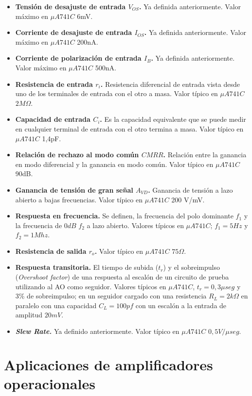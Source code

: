 \begin{itemize}
	\item \textbf{Tensión de desajuste de entrada $V_{OS}$.} Ya
	definida anteriormente. Valor máximo en $\mu A 741C$ 6mV.
	\item \textbf{Corriente de desajuste de entrada $I_{OS}$.} Ya
	definida anteriormente. Valor máximo en $\mu A 741C$ 200nA.
	\item  \textbf{Corriente de polarización de entrada $I_B$.} Ya
	definida anteriormente. Valor máximo en $\mu A 741C$ 500nA.
	\item \textbf{Resistencia de entrada $r_i$.} Resistencia
	diferencial de entrada vista desde uno de los terminales de
	entrada con el otro a masa. Valor típico en $\mu A 741C$  $2M\Omega$.
	\item \textbf{Capacidad de entrada $C_i$.} Es la capacidad
	equivalente que se puede medir en  cualquier terminal de entrada
	con el otro termina a masa. Valor típico en $\mu A 741C$ 1,4pF.
	\item \textbf{Relación de rechazo al modo común $CMRR$.}
	Relación entre la ganancia en modo diferencial y la ganancia en
	modo común. Valor típico en $\mu A 741C$ 90dB.
	\item \textbf{Ganancia de tensión de gran señal $A_{VD}$.}
	Ganancia de tensión a lazo abierto a bajas frecuencias. Valor típico en $\mu A 741C$ 200 V/mV.
	\item \textbf{Respuesta en frecuencia.} Se definen, la frecuencia del polo
	dominante $f_1$ y la frecuencia de $0 dB$ $f_2$ a lazo abierto. Valores típicos en $\mu A
	741C$; $f_1=5Hz$ y $f_2=1Mhz$.
	\item \textbf{Resistencia de salida $r_o$.} Valor típico en $\mu A 741C$  $75 \Omega$.
	\item \textbf{Respuesta transitoria.} El tiempo de subida ($t_r$) y el
	sobreimpulso (\emph{Overshoot factor}) de una respuesta al escalón de un circuito de
	prueba utilizando al AO como seguidor. Valores típicos en $\mu A 741C$, $t_r=0,3 \mu seg$ y 3\% de
	sobreimpulso; en un seguidor cargado con una resistencia
	$R_L=2k\Omega$ en paralelo con una capacidad $C_L=100 pf$ con
	un escalón a la entrada de amplitud $20 mV$.
	\item \emph{\textbf{Slew Rate.}} Ya definido anteriormente. Valor típico en $\mu A 741C$ $0,5V/\mu seg$.
\end{itemize}


\section{Aplicaciones de amplificadores operacionales}

